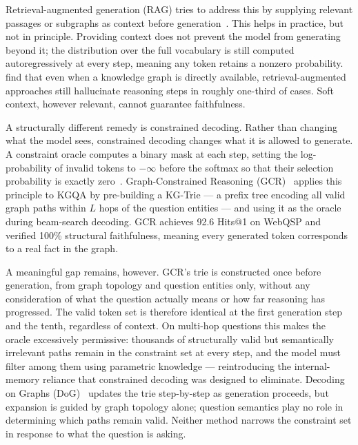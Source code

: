Retrieval-augmented generation (RAG) tries to address this by supplying relevant passages or subgraphs as context before generation~\citep{lewis2020rag,izacard2021leveraging}. This helps in practice, but not in principle. Providing context does not prevent the model from generating beyond it; the distribution over the full vocabulary is still computed autoregressively at every step, meaning any token retains a nonzero probability. \citet{luo2025-graph-constrained-reasoning} find that even when a knowledge graph is directly available, retrieval-augmented approaches still hallucinate reasoning steps in roughly one-third of cases. Soft context, however relevant, cannot guarantee faithfulness.

A structurally different remedy is constrained decoding. Rather than changing what the model sees, constrained decoding changes what it is allowed to generate. A constraint oracle computes a binary mask at each step, setting the log-probability of invalid tokens to $-\infty$ before the softmax so that their selection probability is exactly zero~\citep{geng2023grammarconstrained,willard2023outlines}. Graph-Constrained Reasoning (GCR)~\citep{luo2025-graph-constrained-reasoning} applies this principle to KGQA by pre-building a KG-Trie — a prefix tree encoding all valid graph paths within $L$ hops of the question entities — and using it as the oracle during beam-search decoding. GCR achieves 92.6 Hits@1 on WebQSP and verified 100\% structural faithfulness, meaning every generated token corresponds to a real fact in the graph.

A meaningful gap remains, however. GCR's trie is constructed once before generation, from graph topology and question entities only, without any consideration of what the question actually means or how far reasoning has progressed. The valid token set is therefore identical at the first generation step and the tenth, regardless of context. On multi-hop questions this makes the oracle excessively permissive: thousands of structurally valid but semantically irrelevant paths remain in the constraint set at every step, and the model must filter among them using parametric knowledge — reintroducing the internal-memory reliance that constrained decoding was designed to eliminate. Decoding on Graphs (DoG)~\citep{li2024-decoding-on-graphs} updates the trie step-by-step as generation proceeds, but expansion is guided by graph topology alone; question semantics play no role in determining which paths remain valid. Neither method narrows the constraint set in response to what the question is asking.

